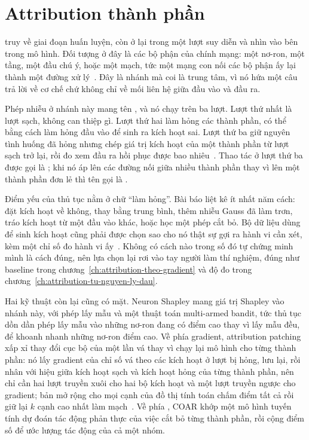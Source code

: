 \section{Attribution thành phần}
\label{sec:ch07-attribution-thanh-phan}

%
%
%
 truy về giai đoạn huấn luyện, còn
 ở lại trong một lượt suy diễn
và nhìn vào bên trong mô hình. Đối tượng ở đây là các bộ phận của chính mạng: một nơ-ron, một
tầng, một đầu chú ý, hoặc một mạch, tức một mạng con nối các bộ phận ấy lại thành
một đường xử lý~\autocite{p18unified}. Đây là nhánh mà
 coi là trung tâm, vì nó hứa
một câu trả lời về cơ chế chứ không chỉ về mối liên hệ giữa đầu vào và đầu ra.

Phép nhiễu ở nhánh này mang tên
, và nó chạy trên
ba lượt. Lượt thứ nhất là lượt sạch, không can thiệp gì. Lượt thứ hai làm hỏng
các thành phần, có thể bằng cách làm hỏng đầu vào để sinh ra kích hoạt sai. Lượt
thứ ba giữ nguyên tình huống đã hỏng nhưng chép giá trị kích hoạt của một thành
phần từ lượt sạch trở lại, rồi đo xem đầu ra hồi phục được bao
nhiêu~\autocite{p18unified}. Thao tác ở lượt thứ ba được gọi là
; khi nó áp lên các đường nối giữa nhiều
thành phần thay vì lên một thành phần đơn lẻ thì tên gọi là
.

Điểm yếu của thủ tục nằm ở chữ \enquote{làm hỏng}. Bài báo liệt kê ít nhất năm cách: đặt
kích hoạt về không, thay bằng trung bình, thêm nhiễu Gauss đã làm trơn, tráo
kích hoạt từ một đầu vào khác, hoặc học một phép cắt bỏ. Bộ dữ liệu dùng để sinh
kích hoạt cũng phải được chọn sao cho nó thật sự gợi ra hành vi cần xét, kèm một
chỉ số đo hành vi ấy~\autocite{p18unified}. Không có cách nào trong số đó tự
chứng minh mình là cách đúng, nên lựa chọn lại rơi vào tay người làm thí nghiệm,
đúng như baseline trong chương~\ref{ch:attribution-theo-gradient}
và độ đo trong chương~\ref{ch:attribution-tu-nguyen-ly-dau}.

Hai kỹ thuật còn lại cũng có mặt. Neuron Shapley mang giá trị Shapley vào nhánh
này, với phép lấy mẫu và một thuật toán multi-armed bandit, tức thủ tục dồn
dần phép lấy mẫu vào những nơ-ron đang có điểm cao thay vì lấy mẫu đều, để
khoanh nhanh những nơ-ron điểm cao. Về phía gradient, attribution patching xấp
xỉ thay đổi cục bộ của một lần vá thay vì chạy lại mô hình cho từng thành
phần: nó lấy gradient của chỉ số vá theo các kích hoạt ở lượt bị hỏng, lưu
lại, rồi nhân với hiệu giữa kích hoạt sạch và kích hoạt hỏng của từng thành
phần, nên chỉ cần hai lượt truyền xuôi cho hai bộ kích hoạt và một lượt truyền
ngược cho gradient; bản mở rộng cho mọi cạnh của đồ thị tính toán
chấm điểm tất cả
rồi giữ lại $k$ cạnh cao nhất làm mạch~\autocite{p18unified}. Về phía
, COAR khớp một mô hình tuyến tính
dự đoán tác động phản thực của việc cắt bỏ từng thành phần, rồi cộng điểm số để
ước lượng tác động của cả một nhóm.

